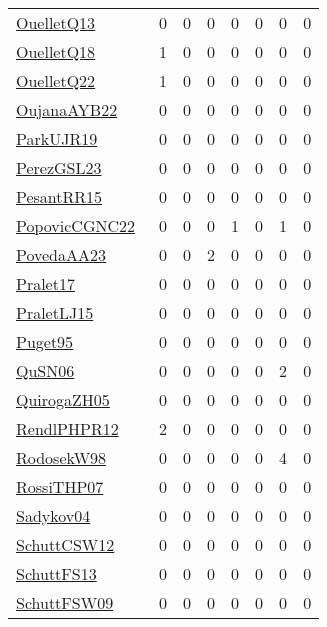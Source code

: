 {\begin{longtable}{l*{7}{r}}
\href{papers/OuelletQ13.pdf}{OuelletQ13}~\cite{OuelletQ13} & 0 & 0 & 0 & 0 & 0 & 0 & 0\\
\href{papers/OuelletQ18.pdf}{OuelletQ18}~\cite{OuelletQ18} & 1 & 0 & 0 & 0 & 0 & 0 & 0\\
\href{papers/OuelletQ22.pdf}{OuelletQ22}~\cite{OuelletQ22} & 1 & 0 & 0 & 0 & 0 & 0 & 0\\
\href{papers/OujanaAYB22.pdf}{OujanaAYB22}~\cite{OujanaAYB22} & 0 & 0 & 0 & 0 & 0 & 0 & 0\\
\href{papers/ParkUJR19.pdf}{ParkUJR19}~\cite{ParkUJR19} & 0 & 0 & 0 & 0 & 0 & 0 & 0\\
\href{papers/PerezGSL23.pdf}{PerezGSL23}~\cite{PerezGSL23} & 0 & 0 & 0 & 0 & 0 & 0 & 0\\
\href{papers/PesantRR15.pdf}{PesantRR15}~\cite{PesantRR15} & 0 & 0 & 0 & 0 & 0 & 0 & 0\\
\href{papers/PopovicCGNC22.pdf}{PopovicCGNC22}~\cite{PopovicCGNC22} & 0 & 0 & 0 & 1 & 0 & 1 & 0\\
\href{papers/PovedaAA23.pdf}{PovedaAA23}~\cite{PovedaAA23} & 0 & 0 & 2 & 0 & 0 & 0 & 0\\
\href{papers/Pralet17.pdf}{Pralet17}~\cite{Pralet17} & 0 & 0 & 0 & 0 & 0 & 0 & 0\\
\href{papers/PraletLJ15.pdf}{PraletLJ15}~\cite{PraletLJ15} & 0 & 0 & 0 & 0 & 0 & 0 & 0\\
\href{papers/Puget95.pdf}{Puget95}~\cite{Puget95} & 0 & 0 & 0 & 0 & 0 & 0 & 0\\
\href{papers/QuSN06.pdf}{QuSN06}~\cite{QuSN06} & 0 & 0 & 0 & 0 & 0 & 2 & 0\\
\href{papers/QuirogaZH05.pdf}{QuirogaZH05}~\cite{QuirogaZH05} & 0 & 0 & 0 & 0 & 0 & 0 & 0\\
\href{papers/RendlPHPR12.pdf}{RendlPHPR12}~\cite{RendlPHPR12} & 2 & 0 & 0 & 0 & 0 & 0 & 0\\
\href{papers/RodosekW98.pdf}{RodosekW98}~\cite{RodosekW98} & 0 & 0 & 0 & 0 & 0 & 4 & 0\\
\href{papers/RossiTHP07.pdf}{RossiTHP07}~\cite{RossiTHP07} & 0 & 0 & 0 & 0 & 0 & 0 & 0\\
\href{papers/Sadykov04.pdf}{Sadykov04}~\cite{Sadykov04} & 0 & 0 & 0 & 0 & 0 & 0 & 0\\
\href{papers/SchuttCSW12.pdf}{SchuttCSW12}~\cite{SchuttCSW12} & 0 & 0 & 0 & 0 & 0 & 0 & 0\\
\href{papers/SchuttFS13.pdf}{SchuttFS13}~\cite{SchuttFS13} & 0 & 0 & 0 & 0 & 0 & 0 & 0\\
\href{papers/SchuttFSW09.pdf}{SchuttFSW09}~\cite{SchuttFSW09} & 0 & 0 & 0 & 0 & 0 & 0 & 0\\

\end{longtable}}
